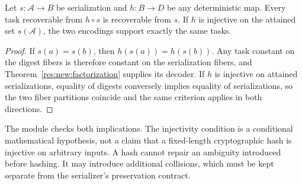 \begin{proposition}
\label{res:new:hash}
Let $s:\mathscr A\to B$ be serialization and $h:B\to D$ be any deterministic map. Every task recoverable from $h\circ s$ is recoverable from $s$. If $h$ is injective on the attained set $s(\mathscr A)$, the two encodings support exactly the same tasks.
\end{proposition}
\begin{proof}
If $s(a)=s(b)$, then $h(s(a))=h(s(b))$. Any task constant on the digest fibers is therefore constant on the serialization fibers, and Theorem~\ref{res:new:factorization} supplies its decoder. If $h$ is injective on attained serializations, equality of digests conversely implies equality of serializations, so the two fiber partitions coincide and the same criterion applies in both directions.
\end{proof}

The module  checks both implications. The injectivity condition is a conditional mathematical hypothesis, not a claim that a fixed-length cryptographic hash is injective on arbitrary inputs. A hash cannot repair an ambiguity introduced before hashing. It may introduce additional collisions, which must be kept separate from the serializer's preservation contract.

